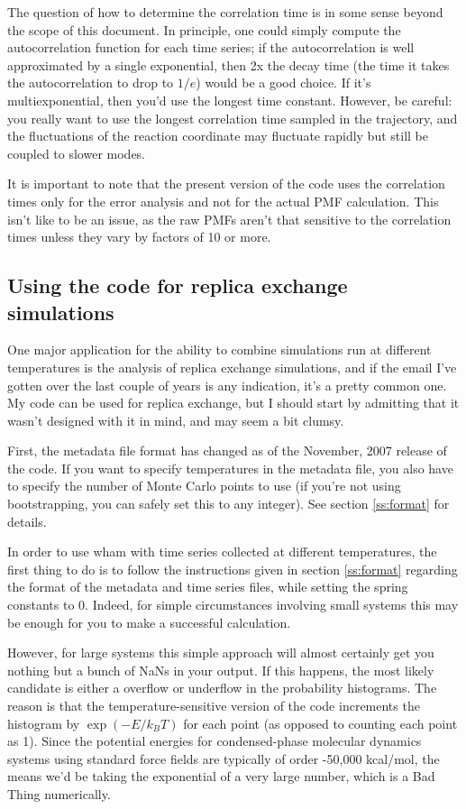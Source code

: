\documentclass[12pt]{article}
\begin{document}
The question of how to determine the correlation time is in some sense beyond
the scope of this document.  In principle, one could simply compute the
autocorrelation function for each time series; if the autocorrelation is well
approximated by a single exponential, then 2x the decay time (the time it
takes the autocorrelation to drop to $1/e$) would be a good choice.  If it's
multiexponential, then you'd use the longest time constant.  However, be
careful: you really want to use the longest correlation time sampled in the
trajectory, and the fluctuations of the reaction coordinate may fluctuate
rapidly but still be coupled to slower modes.  

It is important to note that the present version of the code uses the
correlation times only for the error analysis and not for the actual PMF
calculation.  This isn't like to be an issue, as the raw PMFs aren't that
sensitive to the correlation times unless they vary by factors of 10 or more.  


\subsection{Using the code for replica exchange simulations}
\label{ss:repex}

One major application for the ability to combine simulations run at different
temperatures is the analysis of replica exchange simulations, and if the
email I've gotten over the last couple of years is any indication, it's a
pretty common one.  My code can be used for replica exchange, but I should
start by admitting that it wasn't designed with it in mind, and may seem a
bit clumsy.  

First, the metadata file format has changed as of the November, 2007 release
of the code.  If you want to specify temperatures in the metadata file, you
also have to specify the number of Monte Carlo points to use (if you're not
using bootstrapping, you can safely set this to any integer).  See section
\ref{ss:format} for details.

In order to use wham with time series collected at different temperatures,
the first thing to do is to follow the instructions given in section
\ref{ss:format} regarding the format of the metadata and time series files,
while setting the spring constants to 0.  Indeed, for simple circumstances
involving small systems this may be enough for you to make a successful
calculation.  

However, for large systems this simple approach will almost certainly get you
nothing but a bunch of NaNs in your output.  If this happens, the most likely
candidate is either a overflow or underflow in the probability histograms.
The reason is that the temperature-sensitive version of the code increments
the histogram by $\exp(-E/k_B T)$ for each point (as opposed to counting each
point as 1).  Since the potential energies for condensed-phase
molecular dynamics systems using standard force fields are typically of order
-50,000 kcal/mol, the means we'd be taking the exponential of a very large
number, which is a Bad Thing numerically.  
\end{document}
